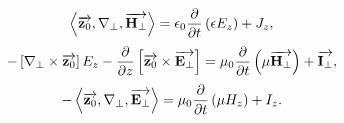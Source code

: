 %
%
\begin{equation} \label{eq:rotHz}
\left< \overrightarrow{\mathbf z_0} , \nabla_\perp , \overrightarrow{\mathbf H_\perp} \right> = 
\epsilon_0 \frac{\partial }{\partial t} \left( \epsilon  E_z \right) + J_z,
\end{equation}
%
%
\begin{equation} \label{eq:rotEt} 
- \left[ \nabla_\perp \times \overrightarrow{\mathbf z_0} \right] E_z -
\frac{\partial }{\partial z} \left[ \overrightarrow{\mathbf z_0} \times \overrightarrow{\mathbf E_\perp} \right] = 
\mu_0 \frac{\partial }{\partial t} \left( \mu  \overrightarrow{\mathbf H_\perp} \right) + \overrightarrow{\mathbf I_\perp},
\end{equation}
%
%
\begin{equation} \label{eq:rotEz}
- \left< \overrightarrow{\mathbf z_0} , \nabla_\perp , \overrightarrow{\mathbf E_\perp} \right> =
\mu_0 \frac{\partial }{\partial t} \left(\mu H_z \right) + I_z.
\end{equation}

